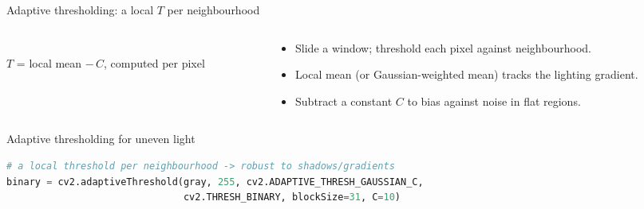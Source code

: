 \documentclass[10pt,aspectratio=169]{beamer}
\begin{document}
\begin{frame}{Adaptive thresholding: a local $T$ per neighbourhood}
  \begin{columns}[T]
    \begin{column}{0.5\textwidth}
    \begin{center}
    \\{\scriptsize $T$ = local mean $-\,C$, computed per pixel}
    \end{center}
    \end{column}
    \begin{column}{0.5\textwidth}
      \begin{itemize}
        \item Slide a window; threshold each pixel against  neighbourhood.
        \item Local mean (or Gaussian-weighted mean) tracks the lighting gradient.
        \item Subtract a constant $C$ to bias against noise in flat regions.
      \end{itemize}
    \end{column}
  \end{columns}
\end{frame}

\begin{frame}[fragile]{Adaptive thresholding for uneven light}
\begin{lstlisting}[language=Python]
# a local threshold per neighbourhood -> robust to shadows/gradients
binary = cv2.adaptiveThreshold(gray, 255, cv2.ADAPTIVE_THRESH_GAUSSIAN_C,
                               cv2.THRESH_BINARY, blockSize=31, C=10)
\end{lstlisting}
\end{frame}
\end{document}
